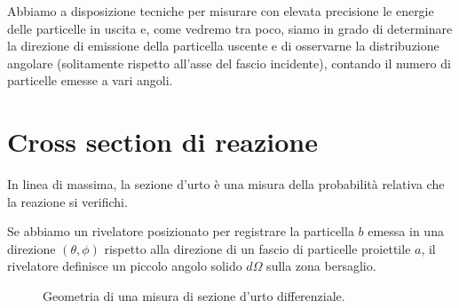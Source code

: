 Abbiamo a disposizione tecniche per misurare con elevata precisione le energie delle particelle in uscita e, come vedremo tra poco, siamo in grado di determinare la direzione di emissione della particella uscente e di osservarne la distribuzione angolare (solitamente rispetto all'asse del fascio incidente), contando il numero di particelle emesse a vari angoli.

\section{Cross section di reazione}

In linea di massima, la sezione d'urto è una misura della probabilità relativa che la reazione si verifichi. 

Se abbiamo un rivelatore posizionato per registrare la particella $b$ emessa in una direzione $(\theta, \phi)$ rispetto alla direzione di un fascio di particelle proiettile $a$, il rivelatore definisce un piccolo angolo solido $d \Omega$ sulla zona bersaglio. 

\begin{figure}[htbp]
    \centering
    \caption{Geometria di una misura di sezione d'urto differenziale.}
    \label{fig:sezione_differenziale}
\end{figure}


